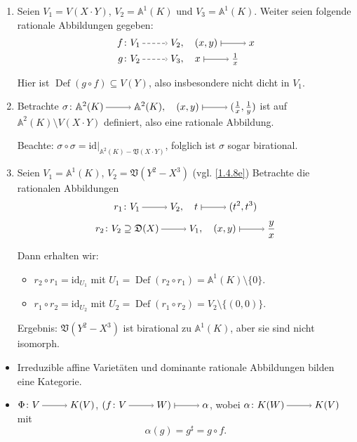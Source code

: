 \documentclass[a4paper,12pt]{scrbook}
\theoremstyle{keinenummern} %
\theoremstyle{mitnummern}
\theoremstyle{unserbeweis}
\def\A{\mathbb{A}}
\def\V{\mathfrak{V}}
\newcommand{\D}{\mathfrak{D}}
\newcommand{\id}{\mathrm{id}}
\newcommand{\Def}{\operatorname{Def}}
\newcommand{\restrict}[1]{|_{#1}}
\newcommand{\ra}{\raisebox{-1pt}{\tikz{\draw[thin,shorten >=3pt, ->] (0,0) node{\hspace*{-2pt}} -- node{} (1,0);}}\penalty1000\relax}
\renewcommand{\mapsto}{\raisebox{-1pt}{\tikz{\draw[thin,shorten >=3pt, |->] (0,0) node{\hspace*{0pt}} -- node{} (1,0);}}\penalty1000\relax}
\newcommand{\ppf}{\raisebox{-1pt}{\tikz{\draw[densely dashed,thin,shorten >=3pt, ->] (0,0) node{\hspace*{-2pt}} -- node{} (1,0);}}\penalty1000\relax}
\begin{document}
\begin{bsp}\label{1.6.6}
  \begin{enumerate}
  \item{} Seien $V_1=V(X\cdot Y)$, $V_2=\A^1(K)$ und $V_3=\A^1(K)$. Weiter seien folgende rationale Abbildungen gegeben:
  \begin{align*}f\colon&V_1\ppf V_2, \quad (x,y)\mapsto x\\
  g\colon&V_2\ppf V_3, \quad x\mapsto \tfrac{1}{x}\end{align*}

  Hier ist $\Def(g\circ f)\subseteq V(Y)$, also insbesondere nicht dicht in $V_1$.
  \item{} Betrachte $\sigma \colon \A^2(K)\ra \A^2(K), \quad (x,y)\mapsto (\frac{1}{x},\frac{1}{y})$ ist auf $\A^2(K)\setminus V(X\cdot Y)$ definiert, also eine rationale Abbildung.

  Beachte: $\sigma\circ \sigma=\id{\restrict{\A^2(K)-\V(X\cdot Y)}}$, folglich ist $\sigma$ sogar birational.

  \item\label{1.6.6c} Seien $V_1=\A^1(K)$, $V_2=\V(Y^2-X^3)$ (vgl. \cref{1.4.8e}) Betrachte die rationalen Abbildungen 
  \[r_1 \colon V_1\ra V_2, \quad t\mapsto (t^2,t^3)\]
  \[r_2 \colon V_2\supseteq \D(X)\ra V_1, \quad (x,y)\mapsto \frac{y}{x}\]

  Dann erhalten wir:\begin{itemize}
     \item $r_2\circ r_1=\id_{U_1}$ mit $U_1=\Def(r_2\circ r_1)=\A^1(K)\setminus \{0\}$.
     \item $r_1\circ r_2=\id_{U_2}$ mit $U_2=\Def(r_1\circ r_2)=V_2\setminus \{(0,0)\}$.
     \end{itemize}
  Ergebnis: $\V(Y^2-X^3)$ ist birational zu $\A^1(K)$, aber sie sind nicht isomorph.
  \end{enumerate}
\end{bsp}  

\begin{nbem}
\begin{itemize}[leftmargin=*,labelindent=\parindent]
  \item Irreduzible affine Varietäten und dominante rationale Abbildungen bilden eine Kategorie.
  \item $\Phi \colon V\ra K(V)$, $(f\colon V\ra W)\mapsto \alpha$, wobei $\alpha\colon K(W)\ra K(V)$ mit \[\alpha(g)=g^{\sharp}=g\circ f.\]
\end{itemize}
\end{nbem}
 
\end{document}
